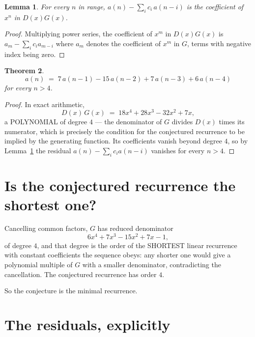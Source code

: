 \documentclass[11pt,a4paper]{article}
\theoremstyle{plain}
\newtheorem{theorem}{Theorem}
\newtheorem{lemma}[theorem]{Lemma}
\theoremstyle{definition}
\begin{document}
\begin{lemma}\label{lem:key}
For every $n$ in range, $a(n)-\sum_i c_i\,a(n-i)$ is the coefficient of $x^{n}$ in
$D(x)G(x)$.
\end{lemma}

\begin{proof}
Multiplying power series, the coefficient of $x^{m}$ in $D(x)G(x)$ is
$a_m-\sum_i c_i a_{m-i}$ where $a_m$ denotes the coefficient of $x^{m}$ in $G$, terms with
negative index being zero.
\end{proof}

\begin{theorem}
\[
a(n)\;=\;7\,a(n-1) - 15\,a(n-2) + 7\,a(n-3) + 6\,a(n-4)
\]
for every $n>4$.
\end{theorem}

\begin{proof}
In exact arithmetic,
\[
D(x)\,G(x)\;=\;18 x^{4} + 28 x^{3} - 32 x^{2} + 7 x,
\]
a POLYNOMIAL of degree $4$ --- the denominator of $G$ divides $D(x)$ times its numerator,
which is precisely the condition for the conjectured recurrence to be implied by the
generating function. Its coefficients vanish beyond degree $4$, so by
Lemma~\ref{lem:key} the residual $a(n)-\sum_ic_ia(n-i)$ vanishes for every
$n>4$.
\end{proof}

\section{Is the conjectured recurrence the shortest one?}

Cancelling common factors, $G$ has reduced denominator
\[
6 x^{4} + 7 x^{3} - 15 x^{2} + 7 x - 1,
\]
of degree $4$, and that degree is the order of the SHORTEST linear recurrence with
constant coefficients the sequence obeys: any shorter one would give a polynomial multiple of
$G$ with a smaller denominator, contradicting the cancellation. The conjectured recurrence has
order $4$.

So the conjecture is the minimal recurrence.

\section{The residuals, explicitly}
\end{document}
